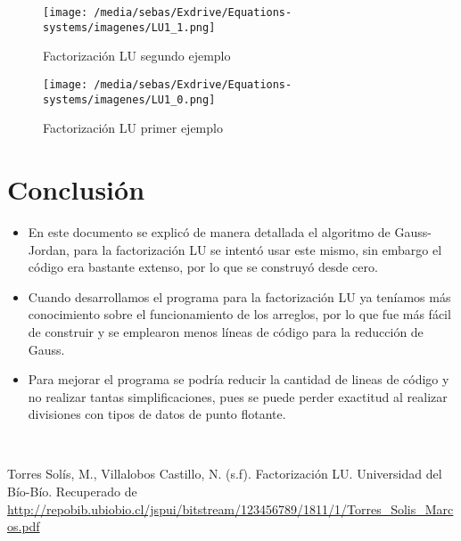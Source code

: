 \documentclass[letterpaper,12pt]{article}
\begin{document}
\begin{figure}[htbp]
    \centering
    \texttt{[image: /media/sebas/Exdrive/Equations-systems/imagenes/LU1\_1.png]}
    \caption{Factorización LU segundo ejemplo}
    \label{fig: Factorización LU segundo ejemplo}
\end{figure}

\begin{figure}[htbp]
    \centering
    \texttt{[image: /media/sebas/Exdrive/Equations-systems/imagenes/LU1\_0.png]}
    \caption{Factorización LU primer ejemplo}
    \label{fig: Factorización LU segundo ejemplo}
\end{figure}

\section{Conclusión}

\begin{itemize}
    \item En este documento se explicó de manera detallada el algoritmo de Gauss-Jordan, para la factorización LU se intentó usar este mismo, sin embargo el código era bastante extenso, por lo que se construyó desde cero.
    \item Cuando desarrollamos el programa para la factorización LU ya teníamos más conocimiento sobre el funcionamiento de los arreglos, por lo que fue más fácil de construir y se emplearon menos líneas de código para la reducción de Gauss.
    \item Para mejorar el programa se podría reducir la cantidad de lineas de código y no realizar tantas simplificaciones, pues se puede perder exactitud al realizar divisiones con tipos de datos de punto flotante.
\end{itemize}
\\
\begin{thebibliography}{99}
Torres Solís, M., Villalobos Castillo, N. (s.f). Factorización LU. Universidad del Bío-Bío. Recuperado de \url{http://repobib.ubiobio.cl/jspui/bitstream/123456789/1811/1/Torres_Solis_Marcos.pdf}

\end{thebibliography}
\end{document}
